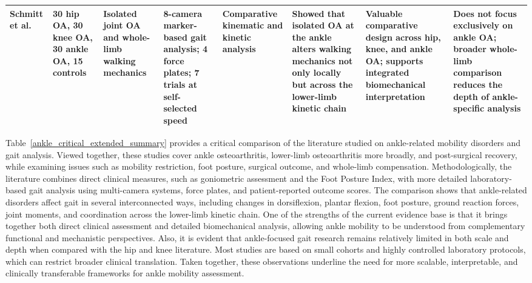 \documentclass[12pt]{elsarticle}
\begin{document}
{\begin{longtable}{p{1.9cm} p{1.6cm} p{1.9cm} p{1.9cm} p{1.7cm} p{1.9cm} p{2.0cm} p{3.0cm}}
Schmitt et al. \cite{schmitt2015effect}
& 30 hip OA, 30 knee OA, 30 ankle OA, 15 controls
& Isolated joint OA and whole-limb walking mechanics
& 8-camera marker-based gait analysis; 4 force plates; 7 trials at self-selected speed
& Comparative kinematic and kinetic analysis
& Showed that isolated OA at the ankle alters walking mechanics not only locally but across the lower-limb kinetic chain
& Valuable comparative design across hip, knee, and ankle OA; supports integrated biomechanical interpretation
& Does not focus exclusively on ankle OA; broader whole-limb comparison reduces the depth of ankle-specific analysis \\
\hline

\end{longtable}
}

Table~\ref{ankle_critical_extended_summary} provides a critical comparison of the literature studied on ankle-related mobility disorders and gait analysis. Viewed together, these studies cover ankle osteoarthritis, lower-limb osteoarthritis more broadly, and post-surgical recovery, while examining issues such as mobility restriction, foot posture, surgical outcome, and whole-limb compensation. Methodologically, the literature combines direct clinical measures, such as goniometric assessment and the Foot Posture Index, with more detailed laboratory-based gait analysis using multi-camera systems, force plates, and patient-reported outcome scores. The comparison shows that ankle-related disorders affect gait in several interconnected ways, including changes in dorsiflexion, plantar flexion, foot posture, ground reaction forces, joint moments, and coordination across the lower-limb kinetic chain. One of the strengths of the current evidence base is that it brings together both direct clinical assessment and detailed biomechanical analysis, allowing ankle mobility to be understood from complementary functional and mechanistic perspectives. Also, it is evident that ankle-focused gait research remains relatively limited in both scale and depth when compared with the hip and knee literature. Most studies are based on small cohorts and highly controlled laboratory protocols, which can restrict broader clinical translation. Taken together, these observations underline the need for more scalable, interpretable, and clinically transferable frameworks for ankle mobility assessment.
\end{document}
